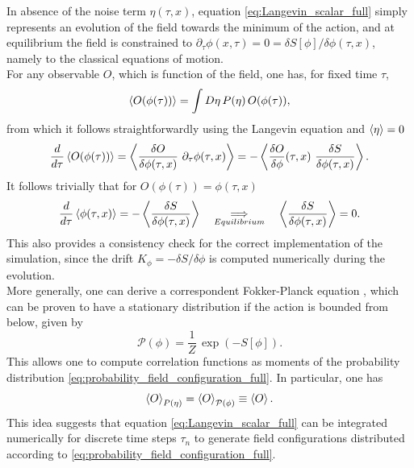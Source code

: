 In absence of the noise term $\eta(\tau,x)$, equation \eqref{eq:Langevin_scalar_full} simply represents an evolution of the field towards the minimum of the action, and at equilibrium the field is constrained to $\partial_\tau \phi(x,\tau) = 0 = \delta S[\phi]/\delta \phi (\tau, x)$, namely to the classical equations of motion.\\
For any observable $O$, which is function of the field, one has, for fixed time $\tau$,
\begin{equation*}
    \left\langle O(\phi(\tau)) \right\rangle = \int D\eta \, P(\eta) \, O(\phi(\tau)),
\end{equation*}
from which it follows straightforwardly using the Langevin equation and $\left\langle \eta \right\rangle = 0$
\begin{equation*}
    \frac{d}{d\tau} \left\langle O(\phi(\tau)) \right\rangle = \left\langle \frac{\delta O}{\delta \phi(\tau, x)} \ \partial_\tau \phi(\tau, x) \right\rangle = -\left\langle \frac{\delta O}{\delta \phi}(\tau, x) \ \frac{\delta S}{\delta \phi(\tau, x)} \right\rangle.
\end{equation*}
It follows trivially that for $O(\phi(\tau)) = \phi(\tau, x)$
\begin{equation*}
        \frac{d}{d\tau} \left\langle \phi(\tau, x) \right\rangle = -\left\langle \frac{\delta S}{\delta \phi(\tau, x)} \right\rangle \quad \underset{Equilibrium}{\Longrightarrow} \quad \left\langle \frac{\delta S}{\delta \phi(\tau, x)} \right\rangle = 0.
\end{equation*}
This also provides a consistency check for the correct implementation of the simulation, since the drift $K_\phi = -\delta S / \delta \phi$ is computed numerically during the evolution. \\
More generally, one can derive a correspondent Fokker-Planck equation \cite{gardiner}, which can be proven to have a stationary distribution if the action is bounded from below, given by \cite{Damgaard1987StochasticQuantization}
\begin{equation}
    \mathcal{P}(\phi) = \frac{1}{Z} \, \exp\left(-S[\phi]\right).
    \label{eq:probability_field_configuration_full}
\end{equation}
This allows one to compute correlation functions as moments of the  probability distribution \eqref{eq:probability_field_configuration_full}. In particular, one has 
\begin{equation}
    \left\langle O \right\rangle_{P(\eta)} = \left\langle O \right\rangle_{\mathcal{P}(\phi)} \equiv \left\langle O \right\rangle.
    \label{eq:expectation_observables}
\end{equation}
This idea suggests that equation \eqref{eq:Langevin_scalar_full} can be integrated numerically for discrete time steps $\tau_n$ to generate field configurations distributed according to \eqref{eq:probability_field_configuration_full}. 
